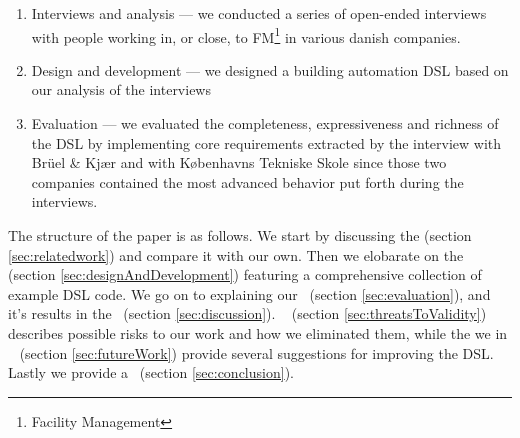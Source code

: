 \begin{enumerate}
	\item Interviews and analysis --- we conducted a series of open-ended interviews with people working in, or close, to FM\footnote{Facility Management} in various danish companies.
	\item Design and development --- we designed a building automation DSL based on our analysis of the interviews
	\item Evaluation --- we evaluated the completeness, expressiveness and richness of the DSL by implementing core requirements extracted by the interview with Br\"{u}el \& Kj\ae r and with K\o benhavns Tekniske Skole since those two companies contained the most advanced behavior put forth during the interviews.
\end{enumerate}

The structure of the paper is as follows. We start by discussing the  (section \ref{sec:relatedwork}) and compare it with our own. Then we elobarate on the~  (section \ref{sec:designAndDevelopment}) featuring a comprehensive collection of example DSL code. We go on to explaining our~  (section \ref{sec:evaluation}), and it's results in the~ (section \ref{sec:discussion}). ~ (section \ref{sec:threatsToValidity}) describes possible risks to our work and how we eliminated them, while the we in ~ (section \ref{sec:futureWork}) provide several suggestions for improving the DSL. Lastly we provide a~ (section \ref{sec:conclusion}).